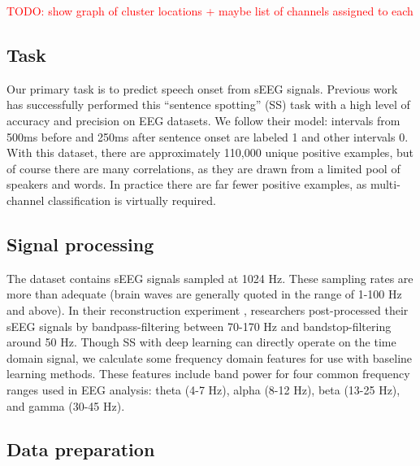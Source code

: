 \documentclass[format=sigconf, nonacm=true, review=true, screen=true]{acmart}
\newcommand{\TODO}[1]{\textcolor{red}{TODO: #1}}
\begin{document}
\TODO{show graph of cluster locations + maybe list of channels assigned to each}


\subsection{Task}

Our primary task is to predict speech onset from sEEG signals. Previous work has successfully performed this ``sentence spotting'' (SS) task with a high level of accuracy and precision on EEG datasets. \cite{sakthi2021keyword} We follow their model: intervals from 500ms before and 250ms after sentence onset are labeled 1 and other intervals 0. With this dataset, there are approximately 110,000 unique positive examples, but of course there are many correlations, as they are drawn from a limited pool of speakers and words. In practice there are far fewer positive examples, as multi-channel classification is virtually required.

\subsection{Signal processing}

The dataset contains sEEG signals sampled at 1024 Hz. These sampling rates are more than adequate (brain waves are generally quoted in the range of 1-100 Hz and above). In their reconstruction experiment \cite{verwoert2022dataset}, researchers post-processed their sEEG signals by bandpass-filtering between 70-170 Hz and bandstop-filtering around 50 Hz. Though SS with deep learning \cite{sakthi2021keyword} can directly operate on the time domain signal, we calculate some frequency domain features for use with baseline learning methods. These features include band power for four common frequency ranges used in EEG analysis: theta (4-7 Hz), alpha (8-12 Hz), beta (13-25 Hz), and gamma (30-45 Hz).

\subsection{Data preparation}
\end{document}
